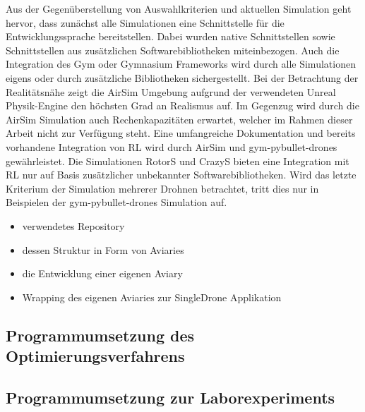 Aus der Gegenüberstellung von Auswahlkriterien und aktuellen Simulation geht hervor, dass zunächst alle Simulationen eine Schnittstelle für die Entwicklungssprache bereitstellen.
Dabei wurden native Schnittstellen sowie Schnittstellen aus zusätzlichen Softwarebibliotheken miteinbezogen.
Auch die Integration des Gym oder Gymnasium Frameworks wird durch alle Simulationen eigens oder durch zusätzliche Bibliotheken sichergestellt.
Bei der Betrachtung der Realitätsnähe zeigt die AirSim Umgebung aufgrund der verwendeten Unreal Physik-Engine den höchsten Grad an Realismus auf.
Im Gegenzug wird durch die AirSim Simulation auch Rechenkapazitäten erwartet, welcher im Rahmen dieser Arbeit nicht zur Verfügung steht.
Eine umfangreiche Dokumentation und bereits vorhandene Integration von RL wird durch AirSim und gym-pybullet-drones gewährleistet.
Die Simulationen RotorS und CrazyS bieten eine Integration mit RL nur auf Basis zusätzlicher unbekannter Softwarebibliotheken.
Wird das letzte Kriterium der Simulation mehrerer Drohnen betrachtet, tritt dies nur in Beispielen der gym-pybullet-drones Simulation auf.


\begin{itemize}
    \item verwendetes Repository
    \item dessen Struktur in Form von Aviaries
    \item die Entwicklung einer eigenen Aviary 
    \item Wrapping des eigenen Aviaries zur SingleDrone Applikation
\end{itemize}
\subsection{Programmumsetzung des Optimierungsverfahrens}
\subsection{Programmumsetzung zur Laborexperiments}
